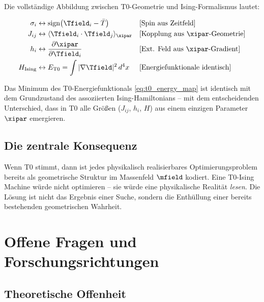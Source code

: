 Die vollständige Abbildung zwischen T0-Geometrie und Ising-Formalismus lautet:

\begin{align}
    \sigma_i &\leftrightarrow \operatorname{sign}\!\left(\Tfield_i - \bar{T}\right)
    &&\text{[Spin aus Zeitfeld]}
    \label{eq:t0_spin_map}\\
    J_{ij} &\leftrightarrow \langle \Tfield_i \cdot \Tfield_j \rangle_{\xipar}
    &&\text{[Kopplung aus $\xipar$-Geometrie]}
    \label{eq:t0_j_map}\\
    h_i &\leftrightarrow \frac{\partial \xipar}{\partial \Tfield_i}
    &&\text{[Ext. Feld aus $\xipar$-Gradient]}
    \label{eq:t0_h_map}\\
    H_{\text{Ising}} &\leftrightarrow E_{\text{T0}} = \int |\nabla \Tfield|^2 \, d^4x
    &&\text{[Energiefunktionale identisch]}
    \label{eq:t0_energy_map}
\end{align}

Das Minimum des T0-Energiefunktionals \eqref{eq:t0_energy_map} ist identisch mit 
dem Grundzustand des assoziierten Ising-Hamiltonians -- mit dem entscheidenden 
Unterschied, dass in T0 alle Größen ($J_{ij}$, $h_i$, $H$) aus einem einzigen 
Parameter $\xipar$ emergieren.

\subsection{Die zentrale Konsequenz}

\begin{revolutionary}
    Wenn T0 stimmt, dann ist jedes physikalisch realisierbares Optimierungsproblem 
    bereits als geometrische Struktur im Massenfeld $\mfield$ kodiert. Eine 
    T0-Ising Machine würde nicht optimieren -- sie würde eine physikalische Realität 
    \emph{lesen}. Die Lösung ist nicht das Ergebnis einer Suche, sondern die 
    Enthüllung einer bereits bestehenden geometrischen Wahrheit.
\end{revolutionary}

\clearpage

\section{Offene Fragen und Forschungsrichtungen}
\label{sec:questions}

\subsection{Theoretische Offenheit}

